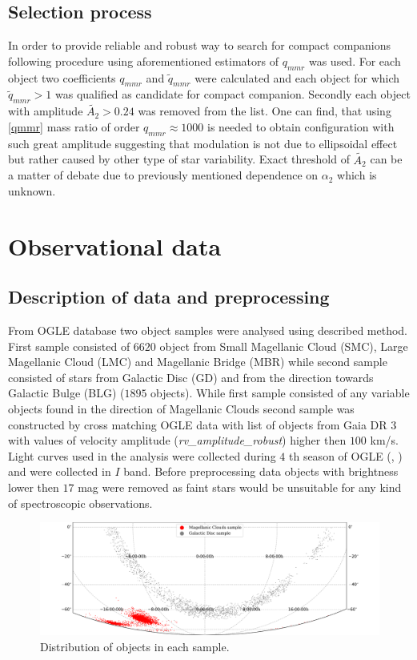 \documentclass{pracalicmgr}
\begin{document}
\section{Selection process}
In order to provide reliable and robust way to search for compact companions following procedure using aforementioned estimators of $q_{mmr}$ was used.
For each object two coefficients $q_{mmr}$ and $\tilde{q}_{mmr}$ were calculated and each object for which $\tilde{q}_{mmr}>1$ was qualified as candidate for compact companion.
Secondly each object with amplitude $\tilde{A_2}>0.24$ was removed from the list. One can find, that using \ref{qmmr} mass ratio of order $q_{mmr}\approx 1000$ is needed
to obtain configuration with such great amplitude 
suggesting that modulation is not due to ellipsoidal effect but rather caused by other type of star variability. Exact threshold of $\tilde{A_2}$ can be a matter of debate due to 
previously mentioned dependence on $\alpha_2$ which is unknown. 

\chapter{Observational data}
\section{Description of data and preprocessing}
From OGLE database two object samples were analysed using described method. First sample consisted of $6620$ object from Small Magellanic Cloud (SMC), Large Magellanic Cloud (LMC) and 
Magellanic Bridge  (MBR) while second sample consisted of stars from Galactic Disc (GD) and from the direction towards Galactic Bulge (BLG) ($1895$ objects). While first sample consisted 
of any variable objects found in the direction of Magellanic Clouds second sample was constructed by cross matching OGLE data with list of objects from Gaia DR 3 \citep{gaia_collaboration_gaia_2022} with values of 
velocity amplitude ({\it{rv\_amplitude\_robust}}) higher then $100$ km/s. Light curves used in the analysis were collected during $4$ th season of OGLE (\citet*{udalski_ogle-iv_2015},
 \citet*{udalski_optical_1992}) and were collected in $I$ band. Before preprocessing data objects with brightness lower then
$17$ mag  were removed as faint stars would be unsuitable for any kind of spectroscopic observations.
\begin{figure}[H]
    \begin{center}
        \includegraphics[scale=0.52]{plots/map_sample.png}
    \end{center}
    \caption{Distribution of objects in each sample.}
\end{figure}
\end{document}
